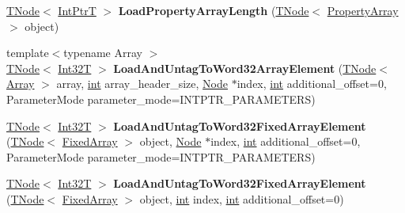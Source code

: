 \begin{DoxyCompactItemize}
\item 
\mbox{\label{classv8_1_1internal_1_1CodeStubAssembler_a6dafd318b665941084d432ffef964a74}} 
\mbox{\hyperlink{classv8_1_1internal_1_1compiler_1_1TNode}{T\+Node}}$<$ \mbox{\hyperlink{structv8_1_1internal_1_1IntPtrT}{Int\+PtrT}} $>$ {\bfseries Load\+Property\+Array\+Length} (\mbox{\hyperlink{classv8_1_1internal_1_1compiler_1_1TNode}{T\+Node}}$<$ \mbox{\hyperlink{classv8_1_1internal_1_1PropertyArray}{Property\+Array}} $>$ object)
\item 
\mbox{\label{classv8_1_1internal_1_1CodeStubAssembler_af89233ea22bf436b6507bcbabc7285b2}} 
{\footnotesize template$<$typename Array $>$ }\\\mbox{\hyperlink{classv8_1_1internal_1_1compiler_1_1TNode}{T\+Node}}$<$ \mbox{\hyperlink{structv8_1_1internal_1_1Int32T}{Int32T}} $>$ {\bfseries Load\+And\+Untag\+To\+Word32\+Array\+Element} (\mbox{\hyperlink{classv8_1_1internal_1_1compiler_1_1TNode}{T\+Node}}$<$ \mbox{\hyperlink{classv8_1_1Array}{Array}} $>$ array, \mbox{\hyperlink{classint}{int}} array\+\_\+header\+\_\+size, \mbox{\hyperlink{classv8_1_1internal_1_1compiler_1_1Node}{Node}} $\ast$index, \mbox{\hyperlink{classint}{int}} additional\+\_\+offset=0, Parameter\+Mode parameter\+\_\+mode=I\+N\+T\+P\+T\+R\+\_\+\+P\+A\+R\+A\+M\+E\+T\+E\+RS)
\item 
\mbox{\label{classv8_1_1internal_1_1CodeStubAssembler_aa8c2a00dec215a02ef29367f583d8a55}} 
\mbox{\hyperlink{classv8_1_1internal_1_1compiler_1_1TNode}{T\+Node}}$<$ \mbox{\hyperlink{structv8_1_1internal_1_1Int32T}{Int32T}} $>$ {\bfseries Load\+And\+Untag\+To\+Word32\+Fixed\+Array\+Element} (\mbox{\hyperlink{classv8_1_1internal_1_1compiler_1_1TNode}{T\+Node}}$<$ \mbox{\hyperlink{classv8_1_1internal_1_1FixedArray}{Fixed\+Array}} $>$ object, \mbox{\hyperlink{classv8_1_1internal_1_1compiler_1_1Node}{Node}} $\ast$index, \mbox{\hyperlink{classint}{int}} additional\+\_\+offset=0, Parameter\+Mode parameter\+\_\+mode=I\+N\+T\+P\+T\+R\+\_\+\+P\+A\+R\+A\+M\+E\+T\+E\+RS)
\item 
\mbox{\label{classv8_1_1internal_1_1CodeStubAssembler_a01d8a6d6905bf045417b97e80757ae7e}} 
\mbox{\hyperlink{classv8_1_1internal_1_1compiler_1_1TNode}{T\+Node}}$<$ \mbox{\hyperlink{structv8_1_1internal_1_1Int32T}{Int32T}} $>$ {\bfseries Load\+And\+Untag\+To\+Word32\+Fixed\+Array\+Element} (\mbox{\hyperlink{classv8_1_1internal_1_1compiler_1_1TNode}{T\+Node}}$<$ \mbox{\hyperlink{classv8_1_1internal_1_1FixedArray}{Fixed\+Array}} $>$ object, \mbox{\hyperlink{classint}{int}} index, \mbox{\hyperlink{classint}{int}} additional\+\_\+offset=0)

\end{DoxyCompactItemize}
